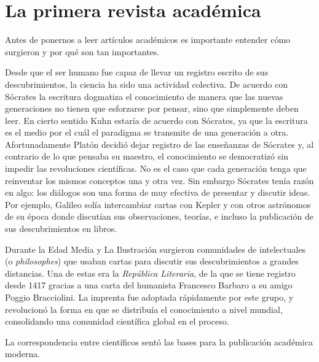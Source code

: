 \section{La primera revista académica}
\label{sec:contexto}
Antes de ponernos a leer artículos académicos es importante entender cómo surgieron y por qué son tan importantes.

Desde que el ser humano fue capaz de llevar un registro escrito de sus descubrimientos, la ciencia ha sido una actividad colectiva.
De acuerdo con Sócrates la escritura dogmatiza el conocimiento de manera que las nuevas generaciones no tienen que esforzarse por pensar, sino que simplemente deben leer.
En cierto sentido Kuhn estaría de acuerdo con Sócrates, ya que la escritura es el medio por el cuál el paradigma se transmite de una generación a otra.
Afortunadamente Platón decidió dejar registro de las enseñanzas de Sócrates y, al contrario de lo que pensaba su maestro, el conocimiento se democratizó sin impedir las revoluciones científicas.
No es el caso que cada generación tenga que reinventar los mismos conceptos una y otra vez.
Sin embargo Sócrates tenía razón en algo: los diálogos son una forma de muy efectiva de presentar y discutir ideas.
Por ejemplo, Galileo solía intercambiar cartas con Kepler y con otros astrónomos de su época donde discutían sus observaciones, teorías, e incluso la publicación de sus descubrimientos en libros.

Durante la Edad Media y La Ilustración surgieron comunidades de intelectuales (o \emph{philosophes}) que usaban cartas para discutir sus descubrimientos a grandes distancias.
Una de estas era la \emph{República Literaria}, de la que se tiene registro desde 1417 gracias a una carta del humanista Francesco Barbaro a su amigo Poggio Bracciolini.
La imprenta fue adoptada rápidamente por este grupo, y revolucionó la forma en que se distribuía el conocimiento a nivel mundial, consolidando una comunidad científica global en el proceso.

\begin{remember}
	La correspondencia entre científicos sentó las bases para la publicación
	académica moderna.
\end{remember}

